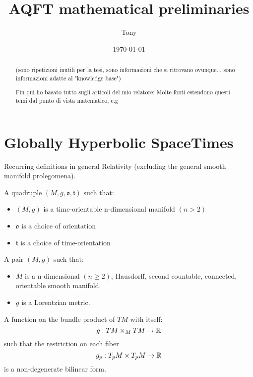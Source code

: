 \documentclass[a4paper,12pt]{scrartcl}    %
\begin{document}
	\title{AQFT mathematical preliminaries}
	\author{Tony}
	\date{\today}
\maketitle

\tableofcontents

\begin{abstract}
		(sono ripetizioni inutili per la tesi, sono informazioni che si ritrovano ovunque... sono informazioni adatte al "knowledge base")
		
		Fin qui ho basato tutto sugli articoli del mio relatore: \cite{primer}\cite{advances} 
		Molte fonti estendono questi temi dal punto di vista matematico, e.g \cite{bar}
\end{abstract}

\newpage
\section{Globally Hyperbolic SpaceTimes}
	Recurring definitions in general Relativity (excluding the general smooth manifold prolegomena).

	\begin{definition}[SpaceTime]
		A quadruple $(M, g, \mathfrak{o}, \mathfrak{t})$ such that:
		\begin{itemize}
			\item $(M,g)$ is a time-orientable n-dimensional manifold $(n>2)$
			\item $\mathfrak{o}$ is a choice of orientation
			\item $\mathfrak{t}$ is a choice of time-orientation
		\end{itemize}
	\end{definition}

	\begin{definition}
		A pair $(M, g)$ such that:
		\begin{itemize}
			\item $M$ is a n-dimensional $(n\geq2)$, Hausdorff, second countable, connected, orientable smooth manifold.
			\item $g$ is a Lorentzian metric.
		\end{itemize}
	\end{definition}
			
	\begin{definition}[Metric]
		A function on the bundle product of $TM$ with itself: $$g: TM \times_M TM \rightarrow \mathbb{R}$$ such that the restriction on each fiber $$g_p: T_pM \times T_pM \rightarrow \mathbb{R} $$ is a non-degenerate bilinear form.
	\end{definition}
	
\end{document}
